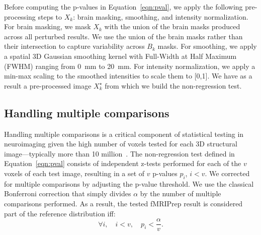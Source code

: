 \documentclass{article}
\newcommand{\fmriprep}{fMRIPrep\xspace}
\newcommand{\fwhm}{\textsc{FWHM}}
\begin{document}
Before computing the p-values in Equation~\ref{eqn:pval}, we apply the following pre-processing steps to $X_k$: brain masking, smoothing, and intensity normalization. For brain masking, we mask $X_k$ with the union of the brain masks produced across all perturbed results. We use the union of the brain masks rather than their intersection to capture variability across $B_k$ masks. For smoothing, we apply a spatial 3D Gaussian smoothing kernel with Full-Width at Half Maximum (\fwhm) ranging from 0~mm to 20~mm. For intensity normalization, we apply a min-max scaling to the smoothed intensities to scale them to [0,1].
We have as a result a pre-processed image $X_k^\star$ from which we build the non-regression test.

\subsection{Handling multiple comparisons}

Handling multiple comparisons is a critical component of statistical testing in neuroimaging given the high number of voxels tested for each 3D structural image---typically more than 10 million~\cite{NICHOLS2007246}. The non-regression test defined in Equation~\ref{eqn:pval} consists of independent z-tests performed for each of the $v$ voxels of each test image, resulting in a set of $v$ p-values $p_i$, $i < v$. We corrected for multiple comparisons by adjusting the p-value threshold. We use the classical Bonferroni correction that simply divides $\alpha$ by the number of multiple comparisons performed. As a result, the tested \fmriprep result is considered part of the reference distribution iff:
\begin{equation}
    \label{eq:bonferroni}
    \forall i, \quad i < v, \quad p_i < \frac{\alpha}{v}.
\end{equation}
\end{document}
